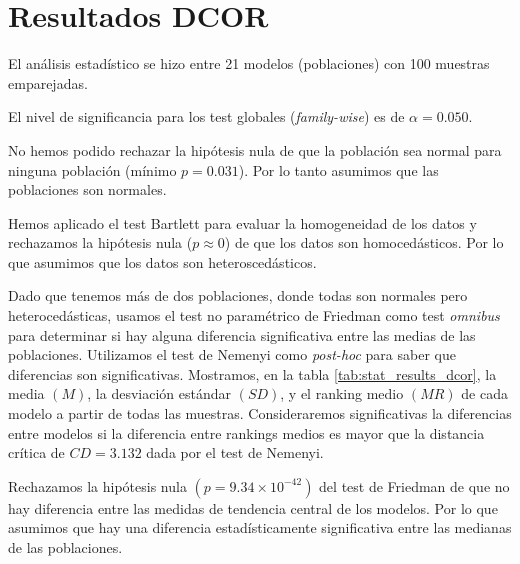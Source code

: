 \documentclass[a4paper,oneside,11pt,leqno]{article}
\begin{document}
	\section{Resultados DCOR}
	\label{sec:results_dcor}
	
	El análisis estadístico se hizo entre 21 modelos (poblaciones) con 100 muestras emparejadas.
	
	El nivel de significancia para los test globales (\textit{family-wise}) es de $\alpha=0.050$.
	
	No hemos podido rechazar la hipótesis nula de que la población sea normal para ninguna población (mínimo $p=0.031$). Por lo tanto asumimos que las poblaciones son normales.
	
	Hemos aplicado el test Bartlett para evaluar la homogeneidad de los datos y rechazamos la hipótesis nula ($p\approx 0$) de que los datos son homocedásticos. Por lo que asumimos que los datos son heteroscedásticos.
	
	Dado que tenemos más de dos poblaciones, donde todas son normales pero heterocedásticas, usamos el test no paramétrico de Friedman como test \textit{omnibus} para determinar si hay alguna diferencia significativa entre las medias de las poblaciones. Utilizamos el test de Nemenyi como \textit{post-hoc} para saber que diferencias son significativas. Mostramos, en la tabla \ref{tab:stat_results_dcor}, la media $(M)$, la desviación estándar $(SD)$, y el ranking medio $(MR)$ de cada modelo a partir de todas las muestras. Consideraremos significativas la diferencias entre modelos si la diferencia entre rankings medios es mayor que la distancia crítica de $CD=3.132$ dada por el test de Nemenyi.

	Rechazamos la hipótesis nula $(p=9.34\times 10^{-42})$ del test de Friedman de que no hay diferencia entre las medidas de tendencia central de los modelos. Por lo que asumimos que hay una diferencia estadísticamente significativa entre las medianas de las poblaciones.
	
\end{document}
